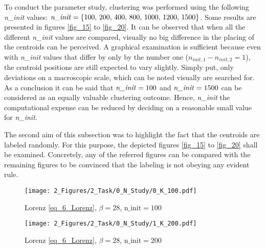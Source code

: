 To conduct the parameter study, clustering was performed using the following \emph{n\_init} values: 
$\text{\emph{n\_init}} = \{100,\, 200, \, 400,\, 800,\, 1000, \, 1200, \, 1500 \}$. 
Some results are presented in figures \ref{fig_15} to \ref{fig_20}.
It can be observed that when all the different \emph{n\_init} values are compared, visually no big difference in the placing of the centroids can be perceived. 
A graphical examination is sufficient because even with \emph{n\_init} values that differ by only by the number one ($n_{init,1} - n_{init,2} = 1 $), the centroid positions are still expected to vary slightly. 
Simply put, only deviations on a macroscopic scale, which can be noted visually are searched for. As a conclusion it can be said that $\text{\emph{n\_init}} = 100$ and $\text{\emph{n\_init}} = 1500$ can be considered as an equally valuable clustering outcome. 
Hence, \emph{n\_init} the computational expense can be reduced by deciding on a reasonable small value for \emph{n\_init}.\newline

The second aim of this subsection was to highlight the fact that the centroids are labeled randomly. For this purpose, the depicted figures \ref{fig_15} to \ref{fig_20} shall be examined. Concretely, any of the referred figures can be compared with the remaining figures to be convinced that the labeling is not obeying any evident rule.


\begin{figure}[!h]
    \begin{minipage}[h]{0.47\textwidth}
        \centering
        \texttt{[image: 2\_Figures/2\_Task/0\_N\_Study/0\_K\_100.pdf]}
        \caption{Lorenz \eqref{eq_6_Lorenz}, $\beta =28$, $\text{n\_init}= 100$}
        \label{fig_15}    
    \end{minipage}
    \hfill
    \begin{minipage}{0.47\textwidth}
        \centering
        \texttt{[image: 2\_Figures/2\_Task/0\_N\_Study/1\_K\_200.pdf]}
        \caption{Lorenz \eqref{eq_6_Lorenz}, $\beta =28$, $\text{n\_init}= 200$}
        \label{fig_16}    
    \end{minipage}
\end{figure}

